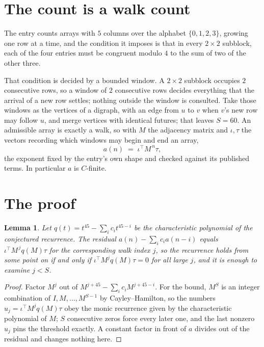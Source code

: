 \documentclass[11pt,a4paper]{article}
\theoremstyle{plain}
\newtheorem{lemma}[theorem]{Lemma}
\theoremstyle{definition}
\begin{document}
\section{The count is a walk count}

The entry counts arrays with $5$ columns over the alphabet $\{0,1,2,3\}$, growing one row at a time, and the condition it imposes is that in every $2\times2$ subblock, each of the four entries must be congruent modulo $4$ to the sum of two of the other three.

That condition is decided by a bounded window. A $2\times2$ subblock occupies $2$ consecutive rows, so a window of $2$ consecutive rows decides everything that the arrival of a new row settles; nothing outside the window is consulted. Take those windows as the vertices of a digraph, with an edge from $u$ to $v$ when $v$'s new row may follow $u$, and merge vertices with identical futures; that leaves $S=60$. An admissible array is exactly a walk, so with $M$ the adjacency matrix and $\iota,\tau$ the vectors recording which windows may begin and end an array,
\[
a(n)\;=\;\iota^{\!\top}M^{\,n}\tau ,
\]
the exponent fixed by the entry's own shape and checked against its published terms. In
particular $a$ is $C$-finite.

\section{The proof}

\begin{lemma}\label{lem:crit}
Let $q(t)=t^{45}-\sum_i c_it^{45-i}$ be the characteristic polynomial of the
conjectured recurrence. The residual $a(n)-\sum_ic_ia(n-i)$ equals
$\iota^{\!\top}M^{\,j}q(M)\tau$ for the corresponding walk index $j$, so the recurrence
holds from some point on if and only if $\iota^{\!\top}M^{j}q(M)\tau=0$ for all large $j$,
and it is enough to examine $j<S$.
\end{lemma}

\begin{proof}
Factor $M^{j}$ out of $M^{j+45}-\sum_ic_iM^{j+45-i}$. For the bound, $M^{S}$
is an integer combination of $I,M,\dots,M^{S-1}$ by Cayley--Hamilton, so the numbers
$u_j=\iota^{\!\top}M^{j}q(M)\tau$ obey the monic recurrence given by the characteristic
polynomial of $M$; $S$ consecutive zeros force every later one, and the last nonzero $u_j$
pins the threshold exactly. A constant factor in front of $a$ divides out of the residual and
changes nothing here.
\end{proof}
\end{document}
